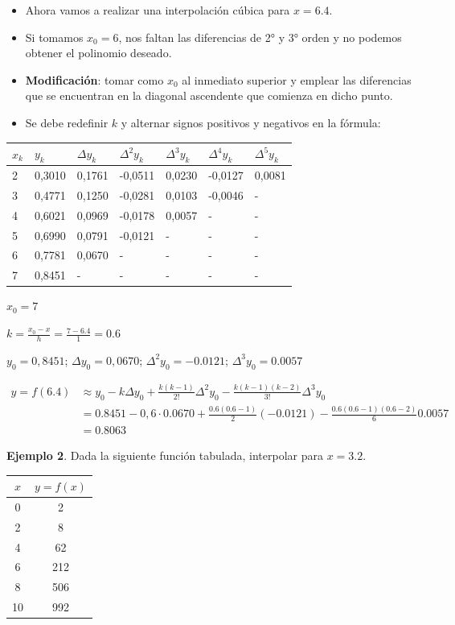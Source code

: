 \documentclass[openany]{book}
\providecommand{\tightlist}{%
  \setlength{\itemsep}{0pt}\setlength{\parskip}{0pt}}
\begin{document}
\begin{itemize}
\tightlist
\item
  Ahora vamos a realizar una interpolación cúbica para \(x=6.4\).
\item
  Si tomamos \(x_0 = 6\), nos faltan las diferencias de 2° y 3° orden y no podemos obtener el polinomio deseado.
\item
  \textbf{Modificación}: tomar como \(x_0\) al inmediato superior y emplear las diferencias que se encuentran en la diagonal ascendente que comienza en dicho punto.
\item
  Se debe redefinir \(k\) y alternar signos positivos y negativos en la fórmula:
\end{itemize}

\begin{longtable}[]{@{}lllllll@{}}
\toprule
\(x_k\) & \(y_k\) & \(\Delta y_k\) & \(\Delta^2 y_k\) & \(\Delta^3 y_k\) & \(\Delta^4 y_k\) & \(\Delta^5 y_k\)\tabularnewline
\midrule
\endhead
2 & 0,3010 & 0,1761 & -0,0511 & 0,0230 & -0,0127 & 0,0081\tabularnewline
3 & 0,4771 & 0,1250 & -0,0281 & 0,0103 & -0,0046 & -\tabularnewline
4 & 0,6021 & 0,0969 & -0,0178 & 0,0057 & - & -\tabularnewline
5 & 0,6990 & 0,0791 & -0,0121 & - & - & -\tabularnewline
6 & 0,7781 & 0,0670 & - & - & - & -\tabularnewline
7 & 0,8451 & - & - & - & - & -\tabularnewline
\bottomrule
\end{longtable}

\(x_0 = 7\)

\(k = \frac{x_0-x}{h} = \frac{7-6.4}{1} = 0.6\)

\(y_0 = 0,8451\); \(\Delta y_0 = 0,0670\); \(\Delta^2 y_0 = -0.0121\); \(\Delta^3 y_0 = 0.0057\)

\[
\begin{aligned}
y = f(6.4) &\approx y_0 - k \Delta y_0 + \frac{k(k-1)}{2!}\Delta^2 y_0 - \frac{k(k-1)(k-2)}{3!}\Delta^3 y_0  \\
  & = 0.8451 - 0,6 \cdot 0.0670 + \frac{0.6 (0.6-1)}{2} (-0.0121) - \frac{0.6(0.6-1)(0.6-2)}{6} 0.0057\\
  & = 0.8063
\end{aligned}
\]

\textbf{Ejemplo 2}. Dada la siguiente función tabulada, interpolar para \(x = 3.2\).

\begin{longtable}[]{@{}cc@{}}
\toprule
\(x\) & \(y=f(x)\)\tabularnewline
\midrule
\endhead
0 & 2\tabularnewline
2 & 8\tabularnewline
4 & 62\tabularnewline
6 & 212\tabularnewline
8 & 506\tabularnewline
10 & 992\tabularnewline
\bottomrule
\end{longtable}
\end{document}
